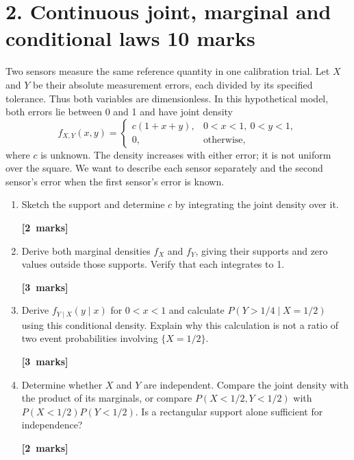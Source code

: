 \documentclass[11pt,a4paper]{article}
\newcommand{\pts}[1]{\par\nobreak\hfill\mbox{\textbf{[#1 marks]}}}
\begin{document}
\clearpage
\section*{2. Continuous joint, marginal and conditional laws \hfill 10 marks}
Two sensors measure the same reference quantity in one calibration trial. Let $X$ and $Y$ be their absolute measurement errors, each divided by its specified tolerance. Thus both variables are dimensionless. In this hypothetical model, both errors lie between 0 and 1 and have joint density
\[
f_{X,Y}(x,y)=\begin{cases}c(1+x+y),&0<x<1,\ 0<y<1,\\0,&\text{otherwise},\end{cases}
\]
where $c$ is unknown. The density increases with either error; it is not uniform over the square. We want to describe each sensor separately and the second sensor's error when the first sensor's error is known.
\begin{enumerate}
\item Sketch the support and determine $c$ by integrating the joint density over it. \pts{2}
\item Derive both marginal densities $f_X$ and $f_Y$, giving their supports and zero values outside those supports. Verify that each integrates to 1. \pts{3}
\item Derive $f_{Y\mid X}(y\mid x)$ for $0<x<1$ and calculate $P(Y>1/4\mid X=1/2)$ using this conditional density. Explain why this calculation is not a ratio of two event probabilities involving $\{X=1/2\}$. \pts{3}
\item Determine whether $X$ and $Y$ are independent. Compare the joint density with the product of its marginals, or compare $P(X<1/2,Y<1/2)$ with $P(X<1/2)P(Y<1/2)$. Is a rectangular support alone sufficient for independence? \pts{2}
\end{enumerate}

\clearpage
\end{document}
